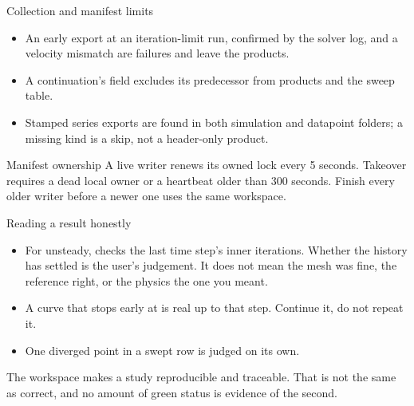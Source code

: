 \begin{frame}{Collection and manifest limits}
\begin{itemize}
\item An early export at an iteration-limit run, confirmed by the solver log,
and a velocity mismatch are failures and leave the products.
\item A continuation's  field excludes its predecessor from
products and the sweep table.
\item Stamped series exports are found in both simulation and datapoint
folders; a missing kind is a skip, not a header-only product.
\end{itemize}
\begin{alertblock}{Manifest ownership}
A live writer renews its owned lock every 5 seconds. Takeover requires a dead
local owner or a heartbeat older than 300 seconds. Finish every older writer
before a newer one uses the same workspace.
\end{alertblock}
\end{frame}

\begin{frame}{Reading a result honestly}
\begin{itemize}
  \item For unsteady,  checks the last time step's inner
        iterations. Whether the history has settled is the user's judgement.
        It does not mean the mesh was
        fine, the reference right, or the physics the one you meant.
  \item A curve that stops early at  is real up to that
        step. Continue it, do not repeat it.
  \item One diverged point in a swept row is judged on its own.
\end{itemize}
\begin{ftslimit}
The workspace makes a study reproducible and traceable. That is not the same
as correct, and no amount of green status is evidence of the second.
\end{ftslimit}
\end{frame}

